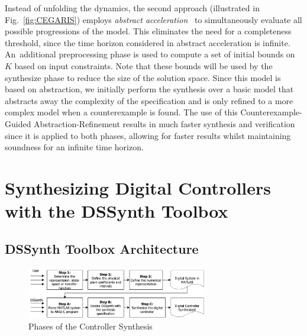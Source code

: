 \documentclass[10pt,conference]{IEEEtran}
\newcommand\tool{{DSSynth Toolbox}\xspace}
\begin{document}
Instead of unfolding the dynamics, the second approach (illustrated in
Fig.~\ref{fig:CEGARIS}) employs {\em abstract
acceleration}~\cite{cattaruzza2015unbounded} to simultaneously evaluate all
possible progressions of the model.  This eliminates the need for a
completeness threshold, since the time horizon considered in abstract
acceleration is infinite.  An~additional preprocessing phase is used to
compute a set of initial bounds on $K$ based on input constraints.  Note
that these bounds will be used by the {\sc synthesize} phase to reduce the
size of the solution space.
%
Since this model is based on abstraction, we initially perform the synthesis
over a basic model that abstracts away the complexity of the specification
and is only refined to a more complex model when a counterexample is found.
%
%
The use of this Counterexample-Guided Abstraction-Refinement results in much
faster synthesis and verification since it is applied to both phases,
allowing for faster results whilst maintaining soundness for an infinite
time horizon.
 

\section{Synthesizing Digital Controllers with the \tool}

\subsection{\tool Architecture}

\begin{figure}[t]
\centering
\includegraphics[width=0.7\textwidth]{synthesis-flow.pdf}
\caption{Phases of the Controller Synthesis}
\label{fig:synthesis-flow}
\end{figure}
\end{document}
